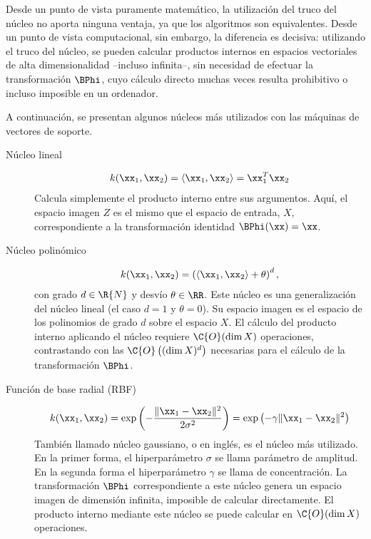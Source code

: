 Desde un punto de vista puramente matemático, la utilización del truco
del núcleo no aporta ninguna ventaja, ya que los algoritmos son
equivalentes.
Desde un punto de vista computacional, sin embargo, la
diferencia es decisiva: utilizando el truco del núcleo, se pueden
calcular productos internos en espacios vectoriales de alta
dimensionalidad --incluso infinita--, sin necesidad de efectuar la
transformación $\BPhi$, cuyo cálculo directo muchas veces resulta
prohibitivo o incluso imposible en un ordenador.


A continuación, se presentan algunos núcleos más
utilizados con las máquinas de vectores de soporte.
%
\begin{description}
%
\item[Núcleo lineal]
  \begin{align}
    k(\xx_1,\xx_2)=\langle \xx_1, \xx_2\rangle=\xx_1^T\xx_2
  \end{align}
  Calcula simplemente el producto interno entre sus argumentos.
  Aquí, el espacio imagen $Z$ es el mismo que el espacio de entrada,
  $X$, correspondiente a la transformación identidad $\BPhi(\xx)=\xx$.
%
\item[Núcleo polinómico]
  \begin{align}
    k(\xx_1,\xx_2)=\left(\langle{}\xx_1,\xx_2\rangle+\theta\right)^d,
  \end{align}
  con grado $d\in\R{N}$ y desvío $\theta\in\RR$.
  Este núcleo es una generalización del núcleo lineal (el caso $d=1$ y
  $\theta=0$).
  Su espacio imagen es el espacio de los polinomios de grado $d$ sobre
  el espacio $X$.
  El cálculo del producto interno aplicando el núcleo requiere
  $\C{O}(\dim{}X)$ operaciones, contrastando con las
  $\C{O}\left((\dim{}X)^d\right)$ necesarias para el cálculo de la
  transformación $\BPhi$.
%
\item[Función de base radial (RBF)]
  \begin{align}
    k(\xx_1,\xx_2)=\exp\left(-\frac{\|\xx_1-\xx_2\|^2}{2\sigma^2}\right)
    =\exp\left(-\gamma\|\xx_1-\xx_2\|^2\right)
  \end{align}
  También llamado núcleo gaussiano, o  en
  inglés, es el núcleo más utilizado.
  En la primer forma, el hiperparámetro $\sigma$ se llama parámetro de
  amplitud.
  En la segunda forma el hiperparámetro $\gamma$ se llama de
  concentración.
  La transformación $\BPhi$ correspondiente a este núcleo genera un
  espacio imagen de dimensión infinita, imposible de calcular
  directamente.
  El producto interno mediante este núcleo se puede calcular en
  $\C{O}(\dim{}X)$ operaciones.
\end{description}
%
